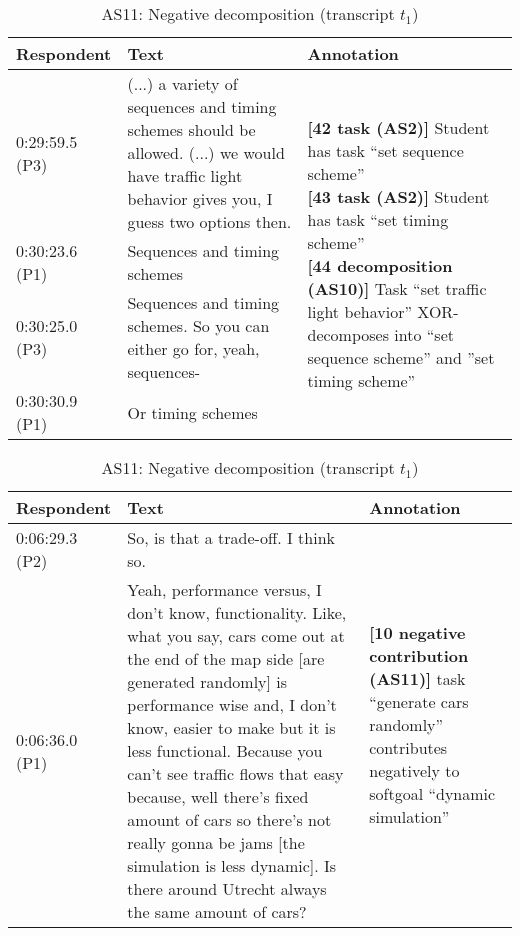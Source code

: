 \begin{table}[!htbp]
\centering
\begin{tabular}{|p{20mm}|p{70mm}|p{60mm}|}
\hline
Respondent & Text & Annotation\\
\hline
0:29:59.5 (P3) & (...) a variety of sequences and timing schemes should be allowed.  (...) we would have traffic light behavior gives you, I guess two options then. & \multirow{4}{60mm}{\textbf{[42 task (AS2)]} Student has task ``set sequence scheme''\newline
\textbf{[43 task (AS2)]} Student has task ``set timing scheme'' \newline
\textbf{[44 decomposition (AS10)] }Task ``set traffic light behavior'' XOR-decomposes into ``set sequence scheme'' and ''set timing scheme''}\\
\cline{1-2}
0:30:23.6 (P1) & Sequences and timing schemes &\\
\cline{1-2}
0:30:25.0 (P3) & Sequences and timing schemes. So you can either go for, yeah, sequences-&\\
\cline{1-2}
0:30:30.9 (P1) & Or timing schemes&\\
\hline	
\end{tabular}
\caption{AS2: Task, AS10: Task decomposition (transcript $t_2$)}
\label{table:transcript:as2-as10}

\begin{tabular}{|p{20mm}|p{100mm}|p{30mm}|}
\hline
Respondent & Text & Annotation\\
\hline
0:06:29.3 (P2) & So, is that a trade-off. I think so. &\multirow{2}{30mm}{\textbf{[10 negative contribution (AS11)]}  task ``generate cars randomly'' contributes negatively to softgoal ``dynamic simulation''}\\	
\cline{1-2}
0:06:36.0 (P1) & Yeah, performance versus, I don't know, functionality. Like, what you say, cars come out at the end of the map side [are generated randomly] is performance wise and, I don't know, easier to make but it is less functional. Because you can't see traffic flows that easy because, well there's fixed amount of cars so there's not really gonna be jams [the simulation is less dynamic]. Is there around Utrecht always the same amount of cars? &\\
\hline	
\end{tabular}
\caption{AS11: Negative decomposition (transcript $t_1$)}
\label{table:transcript:as11}


\end{table}
